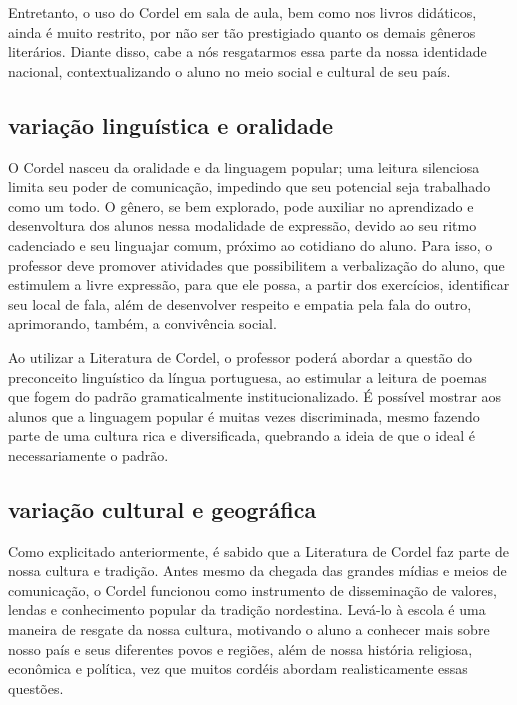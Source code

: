\documentclass[12pt]{extarticle}
\begin{document}
Entretanto, o uso do Cordel em sala de aula, bem como nos livros
didáticos, ainda é muito restrito, por não ser tão prestigiado quanto os
demais gêneros literários. Diante disso, cabe a nós resgatarmos essa
parte da nossa identidade nacional, contextualizando o aluno no meio
social e cultural de seu país.


\subsection{variação linguística e oralidade}

O Cordel nasceu da oralidade e da linguagem popular; uma leitura
silenciosa limita seu poder de comunicação, impedindo que seu potencial
seja trabalhado como um todo. O gênero, se bem explorado, pode auxiliar
no aprendizado e desenvoltura dos alunos nessa modalidade de expressão,
devido ao seu ritmo cadenciado e seu linguajar comum, próximo ao
cotidiano do aluno. Para isso, o professor deve promover atividades que
possibilitem a verbalização do aluno, que estimulem a livre expressão,
para que ele possa, a partir dos exercícios, identificar seu local de
fala, além de desenvolver respeito e empatia pela fala do outro,
aprimorando, também, a convivência social.

Ao utilizar a Literatura de Cordel, o professor poderá abordar a questão
do preconceito linguístico da língua portuguesa, ao estimular a leitura
de poemas que fogem do padrão gramaticalmente institucionalizado. É
possível mostrar aos alunos que a linguagem popular é muitas vezes
discriminada, mesmo fazendo parte de uma cultura rica e diversificada,
quebrando a ideia de que o ideal é necessariamente o padrão.

\subsection{variação cultural e geográfica}

Como explicitado anteriormente, é sabido que a Literatura de Cordel faz
parte de nossa cultura e tradição. Antes mesmo da chegada das grandes
mídias e meios de comunicação, o Cordel funcionou como instrumento de
disseminação de valores, lendas e conhecimento popular da tradição
nordestina. Levá-lo à escola é uma maneira de resgate da nossa cultura,
motivando o aluno a conhecer mais sobre nosso país e seus diferentes
povos e regiões, além de nossa história religiosa, econômica e política,
vez que muitos cordéis abordam realisticamente essas questões.
\end{document}
